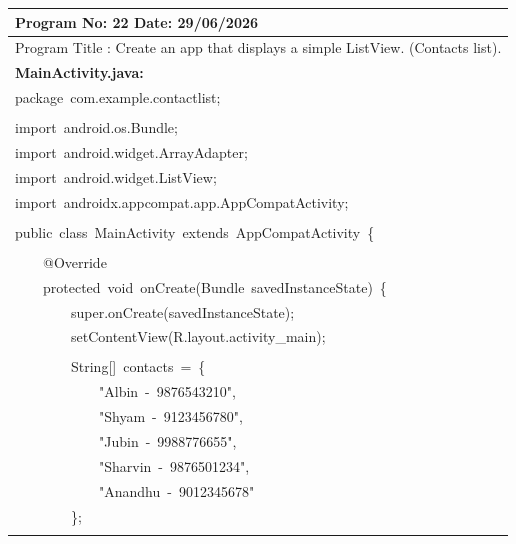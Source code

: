\documentclass[a4paper,12pt]{article}
\begin{document}
\noindent\begingroup
\renewcommand{\arraystretch}{1.1}
\begin{longtable}{|p{}|}
\hline\endfirsthead\hline\endhead\hline\endfoot\hline\endlastfoot
\rule{0pt}{13pt}Program No: 22 \hfill Date: 29/06/2026 \\
\hline
\rule{0pt}{13pt}Program Title : Create an app that displays a simple ListView. (Contacts list). \\
\hline
\rule{0pt}{13pt}\textbf{MainActivity.java:} \\
\hline
{\ttfamily\small package\ com.example.contactlist;} \\
\strut \\
{\ttfamily\small import\ android.os.Bundle;} \\
{\ttfamily\small import\ android.widget.ArrayAdapter;} \\
{\ttfamily\small import\ android.widget.ListView;} \\
{\ttfamily\small import\ androidx.appcompat.app.AppCompatActivity;} \\
\strut \\
{\ttfamily\small public\ class\ MainActivity\ extends\ AppCompatActivity\ \{} \\
\strut \\
{\ttfamily\small \ \ \ \ @Override} \\
{\ttfamily\small \ \ \ \ protected\ void\ onCreate(Bundle\ savedInstanceState)\ \{} \\
{\ttfamily\small \ \ \ \ \ \ \ \ super.onCreate(savedInstanceState);} \\
{\ttfamily\small \ \ \ \ \ \ \ \ setContentView(R.layout.activity\_main);} \\
\strut \\
{\ttfamily\small \ \ \ \ \ \ \ \ String[]\ contacts\ =\ \{} \\
{\ttfamily\small \ \ \ \ \ \ \ \ \ \ \ \ "Albin\ -\ 9876543210",\ } \\
{\ttfamily\small \ \ \ \ \ \ \ \ \ \ \ \ "Shyam\ -\ 9123456780",\ } \\
{\ttfamily\small \ \ \ \ \ \ \ \ \ \ \ \ "Jubin\ -\ 9988776655",} \\
{\ttfamily\small \ \ \ \ \ \ \ \ \ \ \ \ "Sharvin\ -\ 9876501234",\ } \\
{\ttfamily\small \ \ \ \ \ \ \ \ \ \ \ \ "Anandhu\ -\ 9012345678"} \\
{\ttfamily\small \ \ \ \ \ \ \ \ \};} \\
\strut \\

\end{longtable}
\end{document}
